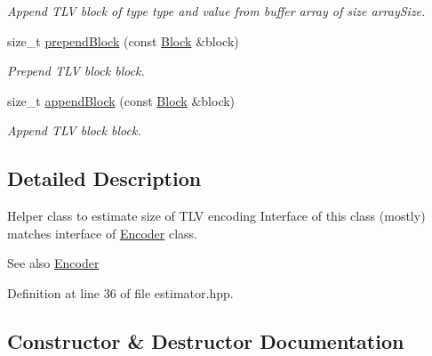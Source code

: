 \begin{DoxyCompactItemize}
\begin{DoxyCompactList}\small\item\em Append T\+LV block of type {\ttfamily type} and value from buffer {\ttfamily array} of size {\ttfamily array\+Size}. \end{DoxyCompactList}\item 
size\+\_\+t \hyperlink{classndn_1_1encoding_1_1Estimator_a137538e8d4e30519c107b3522f63024b}{prepend\+Block} (const \hyperlink{classndn_1_1Block}{Block} \&block)\hypertarget{classndn_1_1encoding_1_1Estimator_a137538e8d4e30519c107b3522f63024b}{}\label{classndn_1_1encoding_1_1Estimator_a137538e8d4e30519c107b3522f63024b}

\begin{DoxyCompactList}\small\item\em Prepend T\+LV block {\ttfamily block}. \end{DoxyCompactList}\item 
size\+\_\+t \hyperlink{classndn_1_1encoding_1_1Estimator_a2403da16becfdfc6154abe5009f8cb88}{append\+Block} (const \hyperlink{classndn_1_1Block}{Block} \&block)\hypertarget{classndn_1_1encoding_1_1Estimator_a2403da16becfdfc6154abe5009f8cb88}{}\label{classndn_1_1encoding_1_1Estimator_a2403da16becfdfc6154abe5009f8cb88}

\begin{DoxyCompactList}\small\item\em Append T\+LV block {\ttfamily block}. \end{DoxyCompactList}\end{DoxyCompactItemize}


\subsection{Detailed Description}
Helper class to estimate size of T\+LV encoding Interface of this class (mostly) matches interface of \hyperlink{classndn_1_1encoding_1_1Encoder}{Encoder} class. 

\begin{DoxySeeAlso}{See also}
\hyperlink{classndn_1_1encoding_1_1Encoder}{Encoder} 
\end{DoxySeeAlso}


Definition at line 36 of file estimator.\+hpp.



\subsection{Constructor \& Destructor Documentation}
